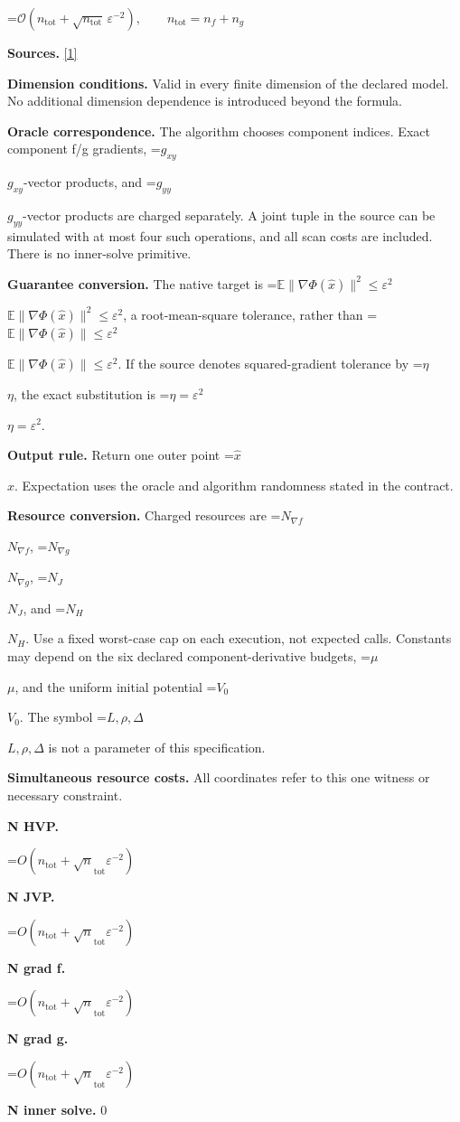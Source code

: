 \documentclass[10pt,a4paper]{article}
\newcommand{\AtlasMath}[1]{\par\begingroup\centering\setbox0=\hbox{$\displaystyle #1$}\ifdim\wd0>1.4\linewidth\typeout{ATLAS WIDE FORMULA: \the\wd0}\fi\ifdim\wd0>\linewidth\resizebox{\linewidth}{!}{\box0}\else\box0\fi\par\endgroup}
\newcommand{\AtlasInlineMath}[1]{\begingroup\setbox0=\hbox{$#1$}\ifdim\wd0>.4\linewidth\endgroup\AtlasMath{#1}\else\endgroup$#1$\fi}
\begin{document}
\AtlasMath{\mathcal{O}\!\left(n_{\mathrm{tot}}+\sqrt{n_{\mathrm{tot}}}\,\varepsilon^{-2}\right),\qquad n_{\mathrm{tot}}=n_f+n_g}
\textbf{Sources.} \href{https://proceedings.mlr.press/v238/dagreou24a/dagreou24a.pdf}{[1]}

\textbf{Dimension conditions.} Valid in every finite dimension of the declared model. No additional dimension dependence is introduced beyond the formula.

\textbf{Oracle correspondence.} The algorithm chooses component indices. Exact component f/g gradients, \AtlasInlineMath{g_{xy}}-vector products, and \AtlasInlineMath{g_{yy}}-vector products are charged separately. A joint tuple in the source can be simulated with at most four such operations, and all scan costs are included. There is no inner-solve primitive.

\textbf{Guarantee conversion.} The native target is \AtlasInlineMath{\mathbb E\|\nabla\Phi(\widehat x)\|^2\le\varepsilon^2}, a root-mean-square tolerance, rather than \AtlasInlineMath{\mathbb E\|\nabla\Phi(\widehat x)\|\le\varepsilon^2}. If the source denotes squared-gradient tolerance by \AtlasInlineMath{\eta}, the exact substitution is \AtlasInlineMath{\eta=\varepsilon^2}.

\textbf{Output rule.} Return one outer point \AtlasInlineMath{\widehat x}. Expectation uses the oracle and algorithm randomness stated in the contract.

\textbf{Resource conversion.} Charged resources are \AtlasInlineMath{N_{\nabla f}}, \AtlasInlineMath{N_{\nabla g}}, \AtlasInlineMath{N_J}, and \AtlasInlineMath{N_H}. Use a fixed worst-case cap on each execution, not expected calls. Constants may depend on the six declared component-derivative budgets, \AtlasInlineMath{\mu}, and the uniform initial potential \AtlasInlineMath{V_0}. The symbol \AtlasInlineMath{L,\rho,\Delta} is not a parameter of this specification.

\textbf{Simultaneous resource costs.} All coordinates refer to this one witness or necessary constraint.

\textbf{N HVP.}

\AtlasMath{O(n_{\mathrm{tot}}+\sqrt n_{\mathrm{tot}}\varepsilon ^{-2})}
\textbf{N JVP.}

\AtlasMath{O(n_{\mathrm{tot}}+\sqrt n_{\mathrm{tot}}\varepsilon ^{-2})}
\textbf{N grad f.}

\AtlasMath{O(n_{\mathrm{tot}}+\sqrt n_{\mathrm{tot}}\varepsilon ^{-2})}
\textbf{N grad g.}

\AtlasMath{O(n_{\mathrm{tot}}+\sqrt n_{\mathrm{tot}}\varepsilon ^{-2})}
\textbf{N inner solve.} 0
\end{document}
